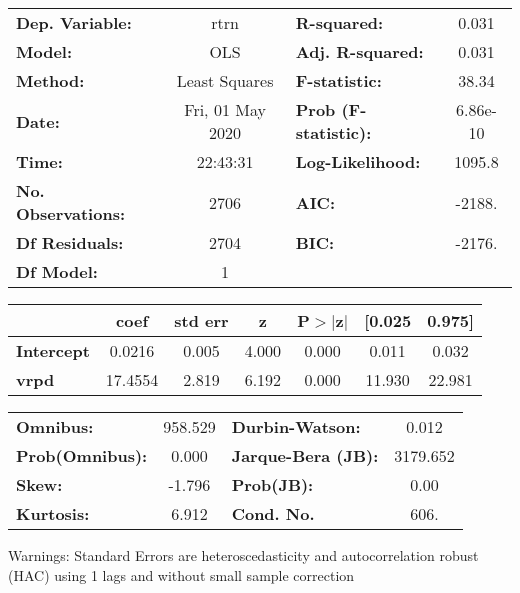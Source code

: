 \begin{center}
\begin{tabular}{lclc}
\toprule
\textbf{Dep. Variable:}    &       rtrn       & \textbf{  R-squared:         } &     0.031   \\
\textbf{Model:}            &       OLS        & \textbf{  Adj. R-squared:    } &     0.031   \\
\textbf{Method:}           &  Least Squares   & \textbf{  F-statistic:       } &     38.34   \\
\textbf{Date:}             & Fri, 01 May 2020 & \textbf{  Prob (F-statistic):} &  6.86e-10   \\
\textbf{Time:}             &     22:43:31     & \textbf{  Log-Likelihood:    } &    1095.8   \\
\textbf{No. Observations:} &        2706      & \textbf{  AIC:               } &    -2188.   \\
\textbf{Df Residuals:}     &        2704      & \textbf{  BIC:               } &    -2176.   \\
\textbf{Df Model:}         &           1      & \textbf{                     } &             \\
\bottomrule
\end{tabular}
\begin{tabular}{lcccccc}
                   & \textbf{coef} & \textbf{std err} & \textbf{z} & \textbf{P$> |$z$|$} & \textbf{[0.025} & \textbf{0.975]}  \\
\midrule
\textbf{Intercept} &       0.0216  &        0.005     &     4.000  &         0.000        &        0.011    &        0.032     \\
\textbf{vrpd}      &      17.4554  &        2.819     &     6.192  &         0.000        &       11.930    &       22.981     \\
\bottomrule
\end{tabular}
\begin{tabular}{lclc}
\textbf{Omnibus:}       & 958.529 & \textbf{  Durbin-Watson:     } &    0.012  \\
\textbf{Prob(Omnibus):} &   0.000 & \textbf{  Jarque-Bera (JB):  } & 3179.652  \\
\textbf{Skew:}          &  -1.796 & \textbf{  Prob(JB):          } &     0.00  \\
\textbf{Kurtosis:}      &   6.912 & \textbf{  Cond. No.          } &     606.  \\
\bottomrule
\end{tabular}
\end{center}

Warnings: \newline
 [1] Standard Errors are heteroscedasticity and autocorrelation robust (HAC) using 1 lags and without small sample correction